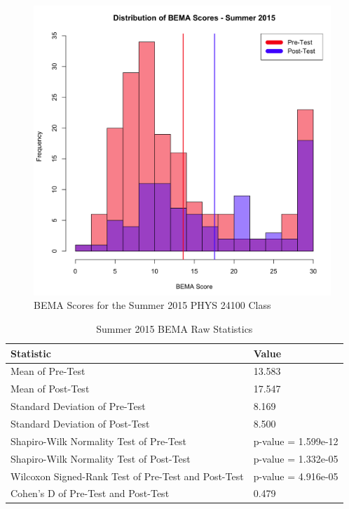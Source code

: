 \pagebreak\clearpage

\begin{figure}
	\centering
	\includegraphics[width=5in]{img/chapter4/bema_summer_2015}
	\caption{BEMA Scores for the Summer 2015 PHYS 24100 Class}
  \label{fig:bemaSu15}
\end{figure}

\pagebreak\clearpage

\begin{small}
\begin{table}
  \centering
  \begin{tabular}{|l|l|}
    \hline
    \textbf{Statistic} & \textbf{Value} \\
	\hline
	Mean of Pre-Test & 13.583 \\
	\hline
	Mean of Post-Test & 17.547 \\
	\hline
	Standard Deviation of Pre-Test & 8.169 \\
	\hline
	Standard Deviation of Post-Test & 8.500 \\
	\hline
	Shapiro-Wilk Normality Test of Pre-Test & p-value = 1.599e-12 \\
	\hline
	Shapiro-Wilk Normality Test of Post-Test & p-value = 1.332e-05 \\
	\hline
	Wilcoxon Signed-Rank Test of Pre-Test and Post-Test & p-value = 4.916e-05 \\
	\hline
	Cohen's D of Pre-Test and Post-Test & 0.479 \\
	\hline
  \end{tabular}
  \caption{Summer 2015 BEMA Raw Statistics}
  \label{tab:statsSu15}
\end{table}
\end{small}

